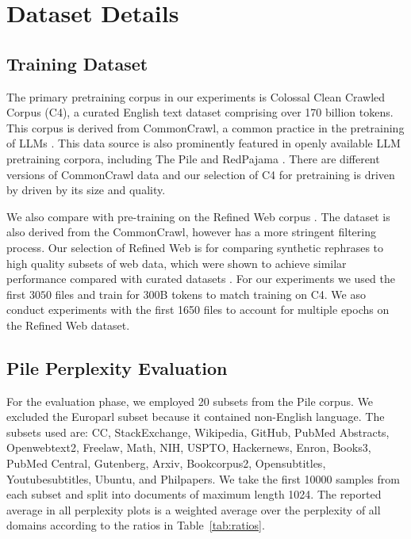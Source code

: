 \documentclass[table]{article}
\begin{document}



\newpage
\appendix
\section{Dataset Details}
\subsection{Training Dataset}

The primary pretraining corpus in our experiments is Colossal Clean Crawled Corpus (C4), a curated English text dataset comprising over 170 billion tokens. This corpus is derived from CommonCrawl, a common practice in the pretraining of LLMs \cite{brown2020language,raffel2020exploring,touvron2023llama}. This data source is also prominently featured in openly available LLM pretraining corpora, including The Pile \cite{gao2020pile} and RedPajama \cite{together2023redpajama}.
 There are different versions of CommonCrawl data and our selection of C4 for pretraining is driven by driven by its size and quality.

 We also compare with pre-training on the Refined Web corpus \cite{penedo2023refinedweb}.  The dataset is also derived from the CommonCrawl, however has a more stringent filtering process. Our selection of Refined Web is for comparing synthetic rephrases to high quality subsets of web data, which were shown to achieve similar performance compared with curated datasets \cite{penedo2023refinedweb}.  For our experiments we used the first $3050$ files and train for 300B tokens to match training on C4.  We aso conduct experiments with the first 1650 files to account for multiple epochs on the Refined Web dataset.  

\subsection{Pile Perplexity Evaluation}
For the evaluation phase, we employed 20 subsets from the Pile corpus. We excluded the Europarl subset because it contained non-English language. The subsets used are:
CC, StackExchange, Wikipedia, GitHub, PubMed Abstracts, Openwebtext2, Freelaw, Math, NIH, USPTO, Hackernews, Enron, Books3, PubMed Central, Gutenberg, Arxiv, Bookcorpus2, Opensubtitles, Youtubesubtitles, Ubuntu, and Philpapers. We take the first 10000 samples from each subset and split into documents of maximum length 1024.  The reported average in all perplexity plots is a weighted average over the perplexity of all domains according to the ratios in Table~\ref{tab:ratios}.  
\end{document}

